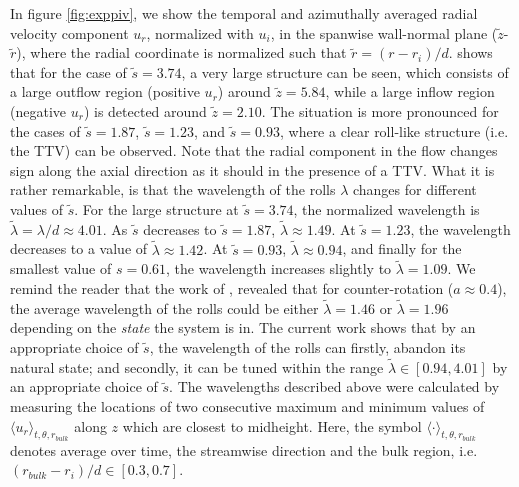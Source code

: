 In figure \ref{fig:exppiv}, we show the temporal and azimuthally averaged radial velocity component $u_r$, normalized with $u_i$, in the spanwise wall-normal plane ($\tilde z$-$\tilde r$), where the radial coordinate is normalized such that $\tilde r = (r - r_i) / d$.  shows that for the case of $\tilde{s}=3.74$, a very large structure can be seen, which consists of a large outflow region (positive $u_r$) around $\tilde{z}=5.84$, while a large inflow region (negative $u_r$) is detected around $\tilde{z}=2.10$. The situation is more pronounced for the cases of $\tilde{s}=1.87$, $\tilde{s}=1.23$, and $\tilde{s}=0.93$, where a clear roll-like  structure (i.e. the TTV) can be observed. Note that the radial component in the flow changes sign along the axial direction as it should in the presence of a TTV. What it is rather remarkable, is that the wavelength of the rolls $\lambda$ changes for different values of $\tilde{s}$. For the large structure at $\tilde{s}=3.74$, the normalized wavelength is $\tilde{\lambda}=\lambda/d \approx 4.01$. As $\tilde{s}$ decreases to $\tilde{s}=1.87$,  $\tilde{\lambda}\approx 1.49$.  At $\tilde{s}=1.23$, the wavelength decreases to a value of $\tilde{\lambda}\approx 1.42$. At $\tilde{s}=0.93$, $\tilde{\lambda}\approx 0.94$, and finally for the smallest value of  $s=0.61$, the wavelength increases slightly to $\tilde{\lambda}=1.09$. We remind the reader that the work of \citet{Huisman2014}, revealed that for counter-rotation ($a \approx 0.4$), the average wavelength of the rolls could be either $\tilde{\lambda}=1.46$ or $\tilde{\lambda}=1.96$ depending on the \textit{state} the system is in. The current work shows that by an appropriate choice of $\tilde{s}$, the wavelength of the rolls can firstly, abandon its natural state; and secondly, it can be tuned within the range $\tilde{\lambda}\in[0.94,4.01]$ by an appropriate choice of $\tilde{s}$. The wavelengths described above were calculated by measuring the locations of two consecutive maximum and minimum values of $\langle u_r \rangle_{t,\theta,r_{bulk}}$ along $z$ which are closest to midheight. Here, the symbol $\langle \cdot \rangle_{t,\theta,r_{bulk}}$ denotes average over time, the streamwise direction and the bulk region, i.e. $(r_{bulk}-r_i)/d\in[0.3,0.7]$.

